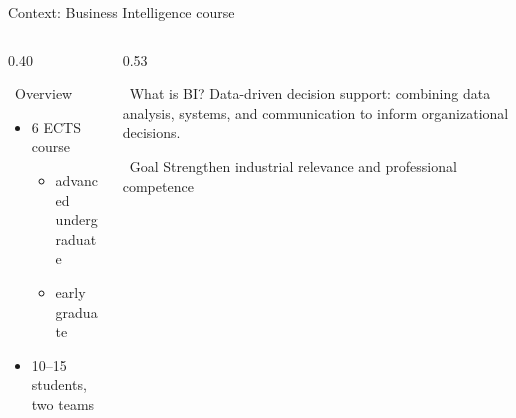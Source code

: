 \begin{frame}{Context: Business Intelligence course}
\begin{columns}[T,onlytextwidth]

\begin{column}{0.40\textwidth}
\begin{exampleblock}{\faMagnifyingGlassChart~Overview}
    \begin{itemize}
        \item 6 ECTS course 
        \begin{itemize}
            \item[\faUser] advanced undergraduate 
            \item[\faUserGraduate] early graduate
        \end{itemize}
        \item 10--15 students, two teams
    \end{itemize}
\end{exampleblock}
\end{column}

\begin{column}{0.53\textwidth}
\begin{block}{\faDatabase~What is BI?}
    Data-driven decision support: combining data analysis, systems, and communication to inform organizational decisions.
\end{block}
\vfill
\begin{block}{\faBullseye~Goal}
    Strengthen industrial relevance and professional competence
\end{block}
\end{column}
\end{columns}



\end{frame}
